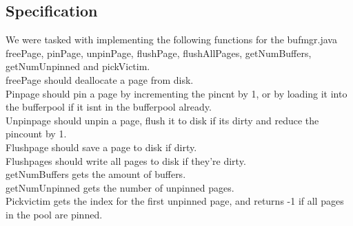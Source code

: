 \documentclass[a4paper,10pt,titlepage]{report}
\begin{document}
\subsection{Specification}
We were tasked with implementing the following functions for the bufmgr.java\\

freePage, pinPage, unpinPage, flushPage, flushAllPages, getNumBuffers, getNumUnpinned and pickVictim. \\

freePage should deallocate a page from disk.\\

Pinpage should pin a page by incrementing the pincnt by 1, or by loading it into the bufferpool if it isnt in the bufferpool already.\\

Unpinpage should unpin a page, flush it to disk if its dirty and reduce the pincount by 1.\\

Flushpage should save a page to disk if dirty.\\

Flushpages should write all pages to disk if they're dirty.\\

getNumBuffers gets the amount of buffers.\\

getNumUnpinned gets the number of unpinned pages.\\

Pickvictim gets the index for the first unpinned page, and returns -1 if all pages in the pool are pinned.

%
\end{document}

